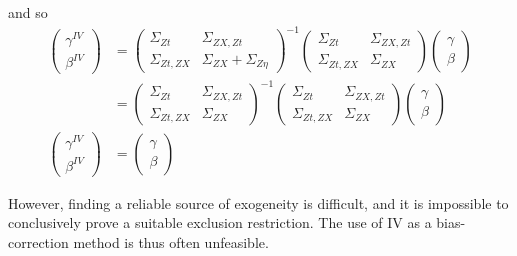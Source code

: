 \documentclass[12pt]{article}
\begin{document}
        and so
        \begin{align}
            \left(\begin{array}{l}
        {\gamma}^{IV} \\
        {\beta}^{IV}
        \end{array}\right)
        & =\left(\begin{array}{cc}
        {\Sigma}_{Zt} & \Sigma_{ZX,Zt} \\
        \Sigma_{Zt,ZX}& {\Sigma}_{ZX}+{\Sigma}_{Z\eta}
        \end{array}\right)^{-1}\left(\begin{array}{cc}
        {\Sigma}_{Zt} & \Sigma_{ZX,Zt} \\
        \Sigma_{Zt,ZX} & {\Sigma}_{ZX}
        \end{array}\right)\left(\begin{array}{l}
        {\gamma} \\
        {\beta}
        \end{array}\right)\\
        & =\left(\begin{array}{cc}
        {\Sigma}_{Zt} & \Sigma_{ZX,Zt} \\
        \Sigma_{Zt,ZX}& {\Sigma}_{ZX}
        \end{array}\right)^{-1}\left(\begin{array}{cc}
        {\Sigma}_{Zt} & \Sigma_{ZX,Zt} \\
        \Sigma_{Zt,ZX} & {\Sigma}_{ZX}
        \end{array}\right)\left(\begin{array}{l}
        {\gamma} \\
        {\beta}
        \end{array}\right) \\
        \left(\begin{array}{l}
        {\gamma}^{IV} \\
        {\beta}^{IV}
        \end{array}\right)
        & =\left(\begin{array}{l}
        {\gamma} \\
        {\beta}
        \end{array}\right)
        \end{align}

        However, finding a reliable source of exogeneity is difficult, and it is impossible to conclusively prove a suitable exclusion restriction. The use of IV as a bias-correction method is thus often unfeasible.\\
\end{document}
